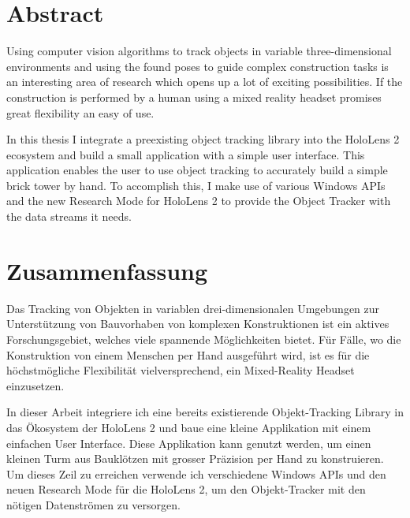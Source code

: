 \chapter*{Abstract}

Using computer vision algorithms to track objects in variable three-dimensional environments and using the found poses to guide complex construction tasks is an interesting area of research which opens up a lot of exciting possibilities. If the construction is performed by a human using a mixed reality headset promises great flexibility an easy of use.

In this thesis I integrate a preexisting object tracking library into the HoloLens 2 ecosystem and build a small application with a simple user interface. This application enables the user to use object tracking to accurately build a simple brick tower by hand. To accomplish this, I make use of various Windows APIs and the new Research Mode for HoloLens 2 to provide the Object Tracker with the data streams it needs.

\cleardoublepage
\chapter*{Zusammenfassung}

Das Tracking von Objekten in variablen drei-dimensionalen Umgebungen zur Unterstützung von Bauvorhaben von komplexen Konstruktionen ist ein aktives Forschungsgebiet, welches viele spannende Möglichkeiten bietet. Für Fälle, wo die Konstruktion von einem Menschen per Hand ausgeführt wird, ist es für die höchstmögliche Flexibilität vielversprechend, ein  Mixed-Reality Headset einzusetzen.

In dieser Arbeit integriere ich eine bereits existierende Objekt-Tracking Library in das Ökosystem der HoloLens 2 und baue eine kleine Applikation mit einem einfachen User Interface. Diese Applikation kann genutzt werden, um einen kleinen Turm aus Bauklötzen mit grosser Präzision per Hand zu konstruieren. Um dieses Zeil zu erreichen verwende ich verschiedene Windows APIs und den neuen Research Mode für die HoloLens 2, um den Objekt-Tracker mit den nötigen Datenströmen zu versorgen.
